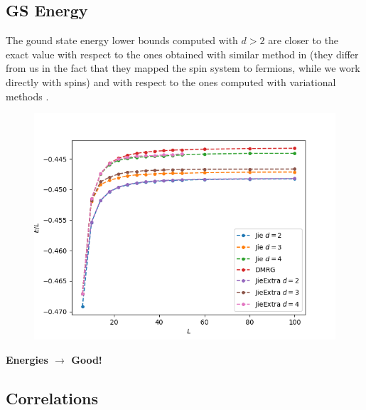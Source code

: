 \documentclass[10pt,a4paper,twoside,twocolumn]{revtex4-1}
\begin{document}
\subsection{GS Energy}

The gound state energy lower bounds computed with $d>2$ are closer to the exact value with respect to the ones obtained with similar method in \cite{baumgratz2012} (they differ from us in the fact that they mapped the spin system to fermions, while we work directly with spins) and with respect to the ones computed with variational methods \cite{haim2020}.

\begin{figure}[H]
  \centerline{
\includegraphics[width=1.\linewidth]{Figures/B1/Energies-d4-Extra.png}}
  \label{Fig:GSE-B1}
\end{figure}

\textbf{Energies $\rightarrow$ Good!}

\subsection{Correlations}
\end{document}
